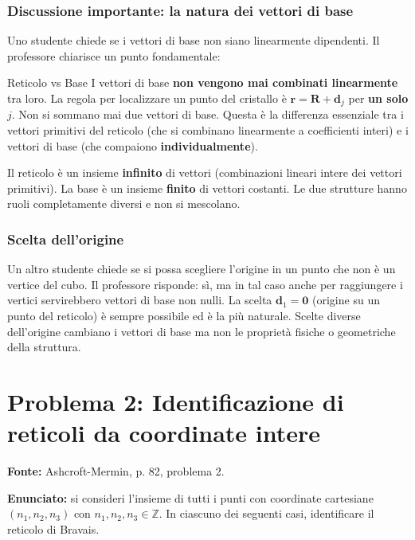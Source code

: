 \subsubsection*{Discussione importante: la natura dei vettori di base}

Uno studente chiede se i vettori di base non siano linearmente dipendenti. Il professore chiarisce un punto fondamentale:

\begin{definizione}{Reticolo vs Base}
I vettori di base \textbf{non vengono mai combinati linearmente} tra loro. La regola per localizzare un punto del cristallo è $\mathbf{r} = \mathbf{R} + \mathbf{d}_j$ per \textbf{un solo} $j$. Non si sommano mai due vettori di base. Questa è la differenza essenziale tra i vettori primitivi del reticolo (che si combinano linearmente a coefficienti interi) e i vettori di base (che compaiono \textbf{individualmente}).

Il reticolo è un insieme \textbf{infinito} di vettori (combinazioni lineari intere dei vettori primitivi). La base è un insieme \textbf{finito} di vettori costanti. Le due strutture hanno ruoli completamente diversi e non si mescolano.
\end{definizione}

\subsubsection*{Scelta dell'origine}

Un altro studente chiede se si possa scegliere l'origine in un punto che non è un vertice del cubo. Il professore risponde: sì, ma in tal caso anche per raggiungere i vertici servirebbero vettori di base non nulli. La scelta $\mathbf{d}_1 = \mathbf{0}$ (origine su un punto del reticolo) è sempre possibile ed è la più naturale. Scelte diverse dell'origine cambiano i vettori di base ma non le proprietà fisiche o geometriche della struttura.

\section{Problema 2: Identificazione di reticoli da coordinate intere}

\textbf{Fonte:} Ashcroft-Mermin, p. 82, problema 2.

\textbf{Enunciato:} si consideri l'insieme di tutti i punti con coordinate cartesiane $(n_1, n_2, n_3)$ con $n_1, n_2, n_3 \in \mathbb{Z}$. In ciascuno dei seguenti casi, identificare il reticolo di Bravais.

